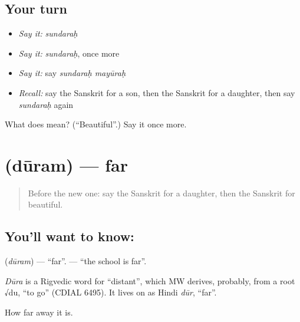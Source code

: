 \subsection*{Your turn}
\begin{itemize}
\raggedright
  \item \emph{Say it:} \emph{sundaraḥ}
  \item \emph{Say it:} \emph{sundaraḥ}, once more
  \item \emph{Say it:} say \emph{sundaraḥ mayūraḥ}
  \item \emph{Recall:} say the Sanskrit for a son, then the Sanskrit for a daughter, then say \emph{sundaraḥ} again
\end{itemize}

\begin{tcolorbox}[breakable,colback=teal!4,colframe=teal!35!black,title={Before you move on}]
What does  mean? (\textquotedblleft{}Beautiful\textquotedblright{}.) Say it once more.
\end{tcolorbox}
\section[\texorpdfstring{\sk{दूरम्} (dūram)}{दूरम् (dūram)}]{ (dūram) — far}

\label{lesson:SA-C89-far}



\begin{quote}
Before the new one: say the Sanskrit for a daughter, then the Sanskrit for beautiful.
\end{quote}

\subsection*{You'll want to know: }
\textbf{} (\emph{dūram}) — \textquotedblleft{}far\textquotedblright{}. \textbf{ } — \textquotedblleft{}the school is far\textquotedblright{}.

\begin{cousinweb}
\emph{Dūra} is a Rigvedic word for \textquotedblleft{}distant\textquotedblright{}, which MW derives, probably, from a root √du, \textquotedblleft{}to go\textquotedblright{} (CDIAL 6495). It lives on as Hindi \emph{dūr}, \textquotedblleft{}far\textquotedblright{}.
\end{cousinweb}

\begin{grammarlens}[title={What you've built}]
How far away it is.
\end{grammarlens}

